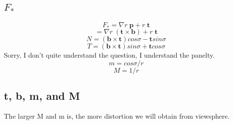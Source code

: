 \documentclass[twoside]{article}
\theoremstyle{definition}
\theoremstyle{definition}
\theoremstyle{remark}
\begin{document}
\subsection{$F_*$}
\[F_* = \nabla r \; \pmb{p} + r\; \pmb{t}\]
\[= \nabla r \; (\pmb{t} \times \pmb{b}) + r\; \pmb{t}\]
\[N = (\pmb{b} \times \pmb{t})cos\sigma - \pmb{t} sin \sigma\]
\[T = (\pmb{b} \times \pmb{t}) sin\sigma +  \pmb{t} cos \sigma\]
Sorry, I don't quite understand the question, I understand the panelty.\\
\[ m = cos \sigma /r\]
\[M = 1/r\]

\subsection{t, b, m, and M}
The larger M and m is, the more distortion we will obtain from viewsphere. 
\end{document}
